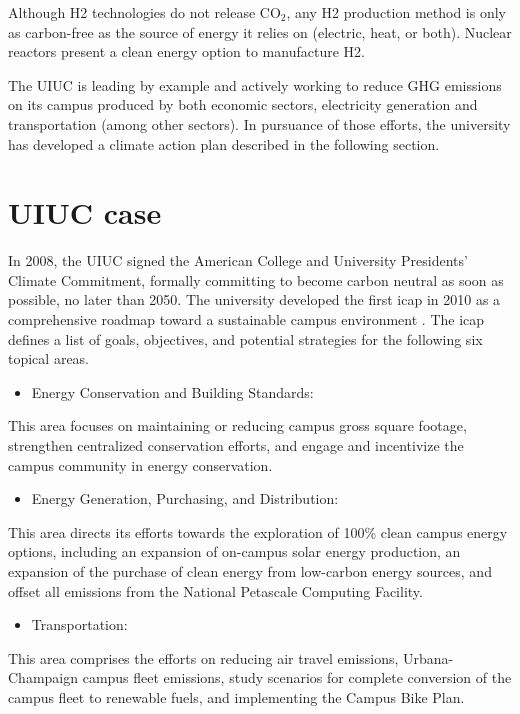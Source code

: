 \documentclass[11pt,letterpaper]{article}
\begin{document}
Although \gls{H2} technologies do not release CO$_2$, any \gls{H2} production method is only as carbon-free as the source of energy it relies on (electric, heat, or both).
Nuclear reactors present a clean energy option to manufacture \gls{H2}.

The \gls{UIUC} is leading by example and actively working to reduce \gls{GHG} emissions on its campus produced by both economic sectors, electricity generation and transportation (among other sectors).
In pursuance of those efforts, the university has developed a climate action plan described in the following section.

\section{\gls{UIUC} case}
In 2008, the \gls{UIUC} signed the American College and University Presidents' Climate Commitment, formally committing to become carbon neutral as soon as possible, no later than 2050.
The university developed the first \gls{icap} in 2010 as a comprehensive roadmap toward a sustainable campus environment \cite{university_of_illinois_at_urbana-champaign_illlinois_2015}.
The \gls{icap} defines a list of goals, objectives, and potential strategies for the following six topical areas.

\begin{itemize}
	\item Energy Conservation and Building Standards:
\end{itemize}
This area focuses on maintaining or reducing campus gross square footage, strengthen centralized conservation efforts, and engage and incentivize the campus community in energy conservation.

\begin{itemize}
	\item Energy Generation, Purchasing, and Distribution:
\end{itemize}
This area directs its efforts towards the exploration of 100\% clean campus energy options, including an expansion of on-campus solar energy production, an expansion of the purchase of clean energy from low-carbon energy sources, and offset all emissions from the National Petascale Computing Facility.

\begin{itemize}
	\item Transportation:
\end{itemize}
This area comprises the efforts on reducing air travel emissions, Urbana-Champaign campus fleet emissions, study scenarios for complete conversion of the campus fleet to renewable fuels, and implementing the Campus Bike Plan.
\end{document}
